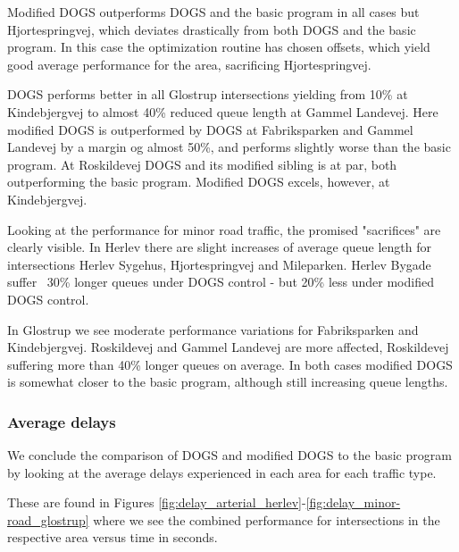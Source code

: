 Modified DOGS outperforms DOGS and the basic program in all cases but Hjortespringvej, which deviates drastically from both DOGS and the basic program. In this case the optimization routine has chosen offsets, which yield good average performance for the area, sacrificing Hjortespringvej.

DOGS performs better in all Glostrup intersections yielding from 10\% at Kindebjergvej to almost 40\% reduced queue length at Gammel Landevej. Here modified DOGS is outperformed by DOGS at Fabriksparken and Gammel Landevej by a margin og almost 50\%, and performs slightly worse than the basic program. At Roskildevej DOGS and its modified sibling is at par, both outperforming the basic program. Modified DOGS excels, however, at Kindebjergvej.

Looking at the performance for minor road traffic, the promised "sacrifices" are clearly visible. In Herlev there are slight increases of average queue length for intersections Herlev Sygehus, Hjortespringvej and Mileparken. Herlev Bygade suffer ~30\% longer queues under DOGS control - but 20\% less under modified DOGS control.

In Glostrup we see moderate performance variations for Fabriksparken and Kindebjergvej. Roskildevej and Gammel Landevej are more affected, Roskildevej suffering more than 40\% longer queues on average. In both cases modified DOGS is somewhat closer to the basic program, although still increasing queue lengths.

\subsubsection*{Average delays}
We conclude the comparison of DOGS and modified DOGS to the basic program by looking at the average delays experienced in each area for each traffic type. 

These are found in Figures \ref{fig:delay_arterial_herlev}-\ref{fig:delay_minor-road_glostrup} where we see the combined performance for intersections in the respective area versus time in seconds.

